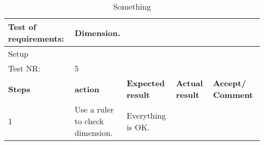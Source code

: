 \begin{table}[h!]
	\centering
	\label{my-label}	
	\begin{tabular}{|p{1.5 cm}|p{2.1 cm}|p{2.1 cm}|p{2.1 cm}|p{2.1 cm}|}
		\hline
		Test of requirements: 
		& \multicolumn{4}{l|}{Dimension.} \\ \hline
		Setup 
		& \multicolumn{4}{l|}{} \\ \hline
		Test NR:
		& \multicolumn{4}{l|}{5} \\ \hline
		\textbf{Steps} & \textbf{action} & \textbf{Expected result} & 
		\textbf{Actual result} & \textbf{Accept/ Comment} \\ \hline
		1 
		& Use a ruler to check dimension.
		& Everything is OK.  
		&
		& \\ \hline
	\end{tabular}
	\caption{Something}
\end{table}

